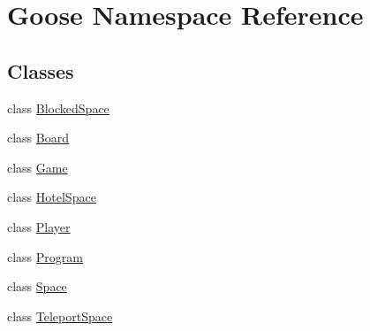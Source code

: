 \hypertarget{namespace_goose}{}\section{Goose Namespace Reference}
\label{namespace_goose}
\subsection*{Classes}
\begin{DoxyCompactItemize}
\item 
class \hyperlink{class_goose_1_1_blocked_space}{Blocked\+Space}
\item 
class \hyperlink{class_goose_1_1_board}{Board}
\item 
class \hyperlink{class_goose_1_1_game}{Game}
\item 
class \hyperlink{class_goose_1_1_hotel_space}{Hotel\+Space}
\item 
class \hyperlink{class_goose_1_1_player}{Player}
\item 
class \hyperlink{class_goose_1_1_program}{Program}
\item 
class \hyperlink{class_goose_1_1_space}{Space}
\item 
class \hyperlink{class_goose_1_1_teleport_space}{Teleport\+Space}
\end{DoxyCompactItemize}
